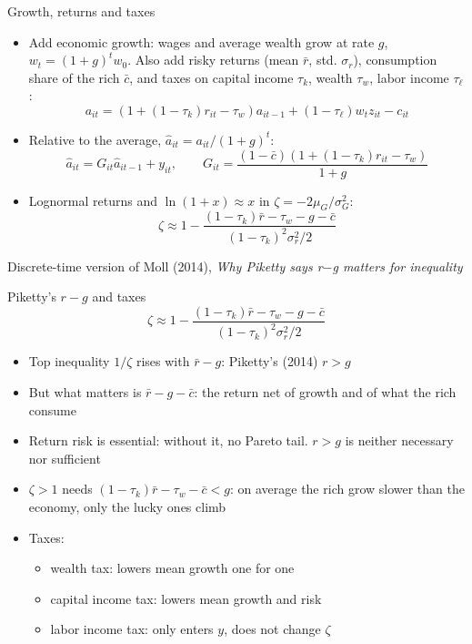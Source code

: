 \documentclass[10pt,english,10pt,handout]{beamer}
\begin{document}
\begin{frame}{Growth, returns and taxes}
\begin{itemize}
\item Add economic growth: wages and average wealth grow at rate $g$, $w_{t}=(1+g)^{t}w_{0}$. Also add risky returns (mean $\bar{r}$, std. $\sigma_{r}$), consumption share of the rich $\bar{c}$, and taxes on capital income $\tau_{k}$, wealth $\tau_{w}$, labor income $\tau_{\ell}$:
\[
a_{it}=\left(1+(1-\tau_{k})r_{it}-\tau_{w}\right)a_{it-1}+(1-\tau_{\ell})w_{t}z_{it}-c_{it}
\]
\item Relative to the average, $\hat{a}_{it}=a_{it}/(1+g)^{t}$:
\[
\hat{a}_{it}=G_{it}\hat{a}_{it-1}+y_{it},\qquad G_{it}=\frac{(1-\bar{c})\left(1+(1-\tau_{k})r_{it}-\tau_{w}\right)}{1+g}
\]
\item Lognormal returns and $\ln(1+x)\approx x$ in $\zeta=-2\mu_{G}/\sigma_{G}^{2}$:
\[
\zeta\approx1-\frac{(1-\tau_{k})\bar{r}-\tau_{w}-g-\bar{c}}{(1-\tau_{k})^{2}\sigma_{r}^{2}/2}
\]
\end{itemize}
{\footnotesize Discrete-time version of Moll (2014), \emph{Why Piketty says r$-$g matters for inequality}}
\end{frame}

\begin{frame}{Piketty's $r-g$ and taxes}
\[
\zeta\approx1-\frac{(1-\tau_{k})\bar{r}-\tau_{w}-g-\bar{c}}{(1-\tau_{k})^{2}\sigma_{r}^{2}/2}
\]
\begin{itemize}
\item Top inequality $1/\zeta$ rises with $\bar{r}-g$: Piketty's (2014) $r>g$
\item But what matters is $\bar{r}-g-\bar{c}$: the return net of growth and of what the rich consume
\item Return risk is essential: without it, no Pareto tail. $r>g$ is neither necessary nor sufficient
\item $\zeta>1$ needs $(1-\tau_{k})\bar{r}-\tau_{w}-\bar{c}<g$: on average the rich grow slower than the economy, only the lucky ones climb
\item Taxes:
\begin{itemize}
\item wealth tax: lowers mean growth one for one
\item capital income tax: lowers mean growth and risk
\item labor income tax: only enters $y$, does not change $\zeta$
\end{itemize}
\end{itemize}
\end{frame}
\end{document}
